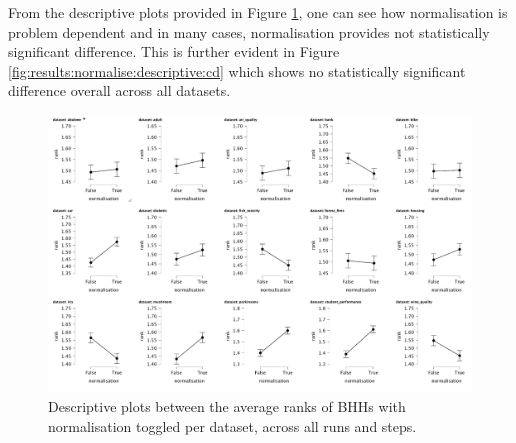 \begin{table}[htbp]
	\centering
	\caption{Post Hoc Comparisons - BHH Variant: Normalise}
	\label{tab:results:normalise:post_hoc}%
	\par\bigskip
\end{table}

From the descriptive plots provided in Figure \ref{fig:results:normalise:descriptive:descriptive}, one can see how normalisation is problem dependent and in many cases, normalisation provides not statistically significant difference. This is further evident in Figure \ref{fig:results:normalise:descriptive:cd} which shows no statistically significant difference overall across all datasets.

\begin{figure}[htbp]
	\centering
	\includegraphics[width=\textwidth]{analysis/bhh_normalise/figures/descriptive/descriptive.png}
	\caption{Descriptive plots between the average ranks of \Acsp{BHH} with normalisation toggled per dataset, across all runs and steps.}
	\label{fig:results:normalise:descriptive:descriptive}
\end{figure}

